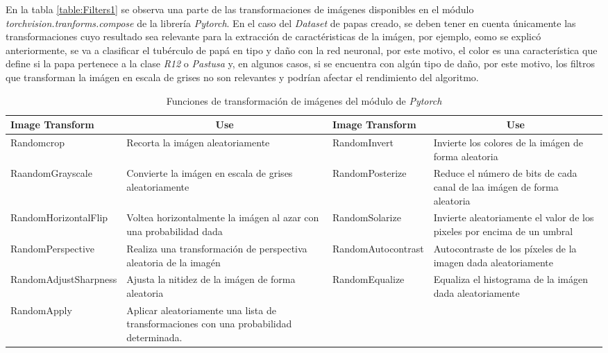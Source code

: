 			En la tabla \ref{table:Filters1} se observa una parte de las transformaciones de imágenes disponibles en el módulo \textit{torchvision.tranforms.compose} de la librería \textit{Pytorch}. En el caso del \textit{Dataset} de papas creado, se deben tener en cuenta únicamente las transformaciones cuyo resultado sea relevante para la extracción de caractéristicas de la imágen, por ejemplo, eomo se explicó anteriormente, se va a clasificar el tubérculo de papá en tipo y daño con la red neuronal, por este motivo, el color es una característica que define si la papa pertenece a la clase \textit{R12} o \textit{Pastusa} y, en algunos casos, si se encuentra con algún tipo de daño, por este motivo, los filtros que transforman la imágen en escala de grises no son relevantes y podrían afectar el rendimiento del algoritmo.
		
			\begin{table}[ht]
				\centering
				\begin{tabular}{|p{4.5cm}|p{3.5cm}|p{3.8cm}|p{3.5cm}|}
					\hline
					Image Transform       & \multicolumn{1}{c|}{Use}                                                               & Image Transform       & \multicolumn{1}{c|}{Use}                                                \\ \hline
					Randomcrop            & Recorta la imágen aleatoriamente                                                       & RandomInvert          & Invierte los colores de la imágen de forma aleatoria                    \\ \hline
					RaandomGrayscale      & Convierte la imágen en escala de grises aleatoriamente                                 & RandomPosterize       & Reduce el número de bits de cada canal de laa imágen de forma aleatoria \\ \hline
					RandomHorizontalFlip  & Voltea horizontalmente la imágen al azar con una probabilidad dada                     & RandomSolarize        & Invierte aleatoriamente el valor de los pixeles por encima de un umbral \\ \hline
					RandomPerspective     & Realiza una transformación de perspectiva aleatoria de la imagén                       & RandomAutocontrast    & Autocontraste de los píxeles de la imagen dada aleatoriamente           \\ \hline
					RandomAdjustSharpness & Ajusta la nitidez de la imágen de forma aleatoria                                      & RandomEqualize        & Equaliza el histograma de la imágen dada aleatoriamente                 \\ \hline
					RandomApply           & Aplicar aleatoriamente una lista de transformaciones con una probabilidad determinada. & \multicolumn{1}{l|}{} &                                                                         \\ \hline
				\end{tabular}
				\label{table:filters2}
				\caption{Funciones de transformación de imágenes del módulo de \textit{Pytorch}}
			\end{table}

